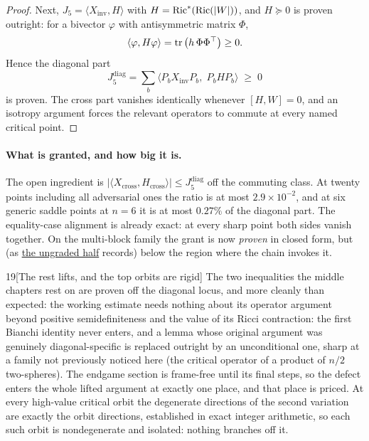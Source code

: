 \begin{proof}
Next, $J_5=\langle X_{\mathrm{inv}},H\rangle$ with $H=\mathrm{Ric}^{*}(\mathrm{Ric}(|W|))$, and $H\succeq0$ is proven outright: for a bivector $\varphi$ with antisymmetric matrix $\Phi$,
\[
\langle\varphi,H\varphi\rangle=\operatorname{tr}\big(h\,\Phi\Phi^{\top}\big)\ge0 .
\]
Hence the diagonal part
\[
J_5^{\mathrm{diag}}=\sum_b\big\langle P_bX_{\mathrm{inv}}P_b,\;P_bHP_b\big\rangle\;\ge\;0
\]
is proven. The cross part vanishes identically whenever $[H,W]=0$, and an isotropy argument forces the relevant operators to commute at every named critical point.
\end{proof}

\paragraph{What is granted, and how big it is.} The open ingredient is $|\langle X_{\mathrm{cross}},H_{\mathrm{cross}}\rangle|\le J_5^{\mathrm{diag}}$ off the commuting class. At twenty points including all adversarial ones the ratio is at most $2.9\times10^{-2}$, and at six generic saddle points at $n=6$ it is at most $0.27\%$ of the diagonal part. The equality-case alignment is already exact: at every sharp point both sides vanish together. On the multi-block family the grant is now \emph{proven} in closed form, but (as \hyperref[sec:ungraded]{the ungraded half} records) below the region where the chain invokes it.

\begin{Lem}{19}[The rest lifts, and the top orbits are rigid]
The two inequalities the middle chapters rest on are proven off the diagonal locus, and more cleanly than expected: the working estimate needs nothing about its operator argument beyond positive semidefiniteness and the value of its Ricci contraction: the first Bianchi identity never enters, and a lemma whose original argument was genuinely diagonal-specific is replaced outright by an unconditional one, sharp at a family not previously noticed here (the critical operator of a product of $n/2$ two-spheres). The endgame section is frame-free until its final steps, so the defect enters the whole lifted argument at exactly one place, and that place is priced. At every high-value critical orbit the degenerate directions of the second variation are exactly the orbit directions, established in exact integer arithmetic, so each such orbit is nondegenerate and isolated: nothing branches off it.
\end{Lem}

